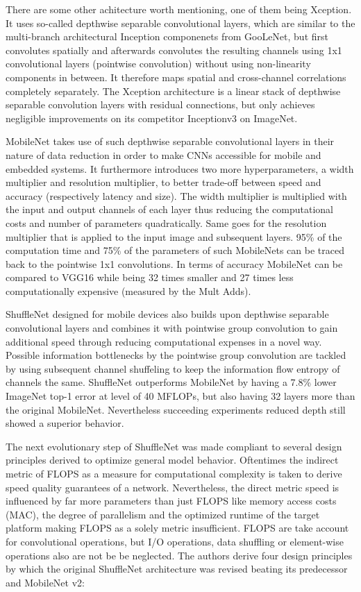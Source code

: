 There are some other achitecture worth mentioning, one of them being Xception. It uses so-called depthwise separable convolutional layers, which are similar to the  multi-branch architectural Inception componenets from GooLeNet, but first convolutes spatially and afterwards convolutes the resulting channels using 1x1 convolutional layers (pointwise convolution) without using non-linearity components in between. It therefore maps spatial and cross-channel correlations completely separately. The Xception architecture is a linear stack of depthwise separable convolution layers with residual connections, but only achieves negligible improvements on its competitor Inceptionv3 on ImageNet. \cite{FrancoisChollet.2017}

MobileNet takes use of such depthwise separable convolutional layers in their nature of data reduction in order to make CNNs accessible for mobile and embedded systems. It furthermore introduces two more hyperparameters, a width multiplier and resolution multiplier, to better trade-off between speed and accuracy (respectively latency and size). The width multiplier is multiplied with the input and output channels of each layer thus reducing the computational costs and number of parameters quadratically. Same goes for the resolution multiplier that is applied to the input image and subsequent layers. 95\% of the computation time and 75\% of the parameters of such MobileNets can be traced back to the pointwise 1x1 convolutions. In terms of accuracy MobileNet can be compared to VGG16 while being 32 times smaller and 27 times less computationally expensive (measured by the Mult Adds). \cite{AndrewGHoward.2017}

ShuffleNet designed for mobile devices also builds upon depthwise separable convolutional layers and combines it with pointwise group convolution to gain additional speed through reducing computational expenses in a novel way. Possible information bottlenecks by the pointwise group convolution are tackled by using subsequent channel shuffeling to keep the information flow entropy of channels the same. ShuffleNet outperforms MobileNet by having a 7.8\% lower ImageNet top-1 error at level of 40 MFLOPs, but also having 32 layers more than the original MobileNet. Nevertheless succeeding experiments reduced depth still showed a superior behavior. \cite{XiangyuZhang.2017}

The next evolutionary step of ShuffleNet was made compliant to several design principles derived to optimize general model behavior. Oftentimes the indirect metric of FLOPS as a measure for computational complexity is taken to derive speed quality guarantees of a network. Nevertheless, the direct metric speed is influenced by far more parameters than just FLOPS like memory access costs (MAC), the degree of parallelism and the optimized runtime of the target platform making FLOPS as a solely metric insufficient. FLOPS are take account for convolutional operations, but I/O operations, data shuffling or element-wise operations also are not be be neglected. The authors derive four design principles by which the original ShuffleNet architecture was revised beating its predecessor and MobileNet v2: \cite{NingningMa.2018}

